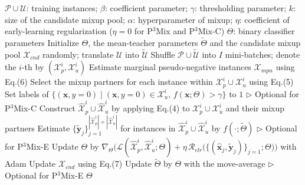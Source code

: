 \documentclass{article}
\begin{document}
\begin{algorithm}[!h]
\renewcommand{\algorithmicrequire}{\textbf{Input:}} %
\renewcommand{\algorithmicensure}{\textbf{Output:}} %
	\caption{P$^3$Mix, P$^3$Mix-E and P$^3$Mix-C (partially positive mixup)} %
	\begin{algorithmic}[1] %
	    \REQUIRE
	    $\mathcal{P}\cup\mathcal{U}$: training instances; $\beta$: coefficient parameter;
	    $\gamma$: thresholding parameter; $k$: size of the candidate mixup pool;
	    $\alpha$: hyperparameter of mixup; $\eta$: coefficient of early-learning regularization
	    ($\eta=0$ for P$^3$Mix and P$^3$Mix-C)
	    \ENSURE
	    $\Theta$: binary classifier parameters
	    \STATE Initialize $\Theta$, the mean-teacher parameters $\widetilde{\Theta}$ and the candidate
	    mixup pool $\mathcal{X}_{cnd}$ randomly; translate $\mathcal{U}$ into $\widetilde{\mathcal{U}}$
	    \STATE Shuffle $\mathcal{P}\cup\widetilde{\mathcal{U}}$ into $I$ mini-batches; denote the
	    $i$-th by $(\mathcal{X}_{p}^{i},\mathcal{X}_{u}^{i})$
	    \STATE Estimate marginal pseudo-negative instances $\mathcal{X}_{mpn}$ using Eq.(6) %
	    \STATE Select the mixup partners for each instance within
	    $\mathcal{X}_{p}^{i}\cup\mathcal{X}_{u}^{i}$ using Eq.(5) %
	    \STATE Set labels of $\{(\mathbf{x},y=0)\mid (\mathbf{x},y=0)\in\mathcal{X}_{u}^{i},\,
	    f(\mathbf{x};\Theta)>\gamma\}$ to $1$
	    \hfill $\triangleright$ Optional for P$^3$Mix-C %
	    \STATE Construct $\widehat{\mathcal{X}}_{p}^{i}\cup\widehat{\mathcal{X}}_{u}^{i}$ by applying
	    Eq.(4) to $\mathcal{X}_{p}^{i}\cup\mathcal{X}_{u}^{i}$ and their mixup partners
	    \STATE Estimate $\{\widetilde{\mathbf{y}}_{j}\}_{j=1}^{|\widehat{\mathcal{X}}_{p}^{i}|+|\widehat{\mathcal{X}}_{u}^{i}|}$
	    for instances in $\widehat{\mathcal{X}}_{p}^{i}\cup\widehat{\mathcal{X}}_{u}^{i}$ by $f(\cdot;\widetilde{\Theta})$
	    \hfill $\triangleright$ Optional for P$^3$Mix-E %
	    \STATE Update $\Theta$ by $\nabla_{\Theta}\Big(\mathcal{L}(\widehat{\mathcal{X}}_{p}^{i},
	    \widehat{\mathcal{X}}_{u}^{i};\Theta)+\eta\,\mathcal{R}_{elr}\big(\{(\widehat{\mathbf{x}}_{j},
	    \widetilde{\mathbf{y}}_{j})\}_{j=1};\Theta\big)\Big)$ with Adam
	    \ENDFOR
	    \STATE Update $\mathcal{X}_{cnd}$ using Eq.(7) %
	    \STATE Update $\widetilde{\Theta}$ by $\Theta$ with the move-average
	    \hfill $\triangleright$ Optional for P$^3$Mix-E
	    \ENDFOR
		\RETURN $\Theta$
	\end{algorithmic}
\end{algorithm}
\end{document}
